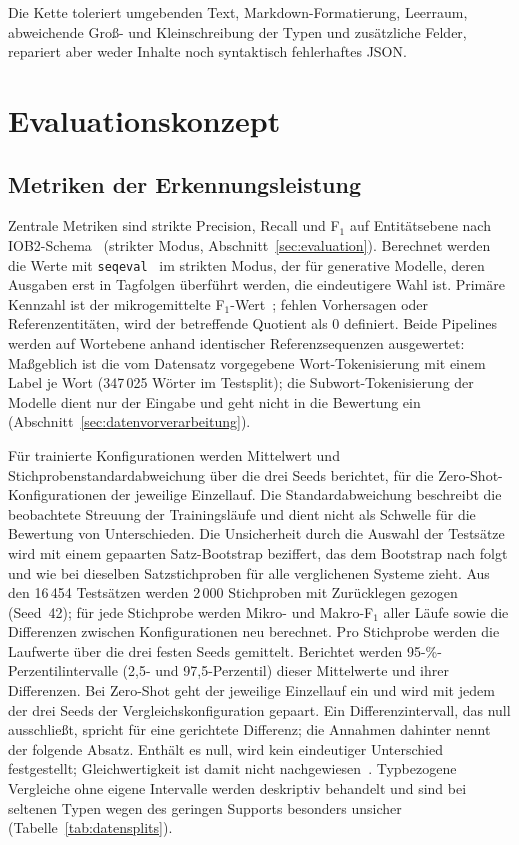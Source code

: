 Die Kette toleriert umgebenden Text, Markdown-Formatierung, Leerraum,
abweichende Groß- und Kleinschreibung der Typen und zusätzliche Felder, repariert aber weder Inhalte
noch syntaktisch fehlerhaftes JSON.

\section{Evaluationskonzept}
\label{sec:evaluationskonzept}

\subsection{Metriken der Erkennungsleistung}
\label{sec:performanzmetriken}

Zentrale Metriken sind strikte Precision, Recall und F$_1$ auf
Entitätsebene nach IOB2-Schema~\cite{manning2008introduction,sang2003conll,tjong1999representing}
(strikter Modus, Abschnitt~\ref{sec:evaluation}).
Berechnet werden die Werte mit
\texttt{seqeval}~\cite{nakayama2018seqeval} im strikten Modus, der für
generative Modelle, deren Ausgaben erst in Tagfolgen überführt werden,
die eindeutigere Wahl ist.
Primäre Kennzahl ist der mikrogemittelte
F$_1$-Wert~\cite{manning2008introduction}; fehlen Vorhersagen
oder Referenzentitäten, wird der betreffende Quotient als 0 definiert.
Beide Pipelines werden auf Wortebene anhand identischer Referenzsequenzen
ausgewertet: Maßgeblich ist die vom Datensatz vorgegebene
Wort-Tokenisierung mit einem Label je Wort (347\,025 Wörter im
Testsplit); die Subwort-Tokenisierung der Modelle dient nur der Eingabe
und geht nicht in die Bewertung ein
(Abschnitt~\ref{sec:datenvorverarbeitung}).

Für trainierte Konfigurationen werden Mittelwert und
Stichprobenstandardabweichung über die drei Seeds berichtet, für die
Zero-Shot-Konfigurationen der jeweilige Einzellauf. Die
Standardabweichung beschreibt die beobachtete Streuung der Trainingsläufe
und dient nicht als Schwelle für die Bewertung von Unterschieden.
Die Unsicherheit durch die Auswahl der Testsätze wird mit einem
gepaarten Satz-Bootstrap beziffert, das dem Bootstrap nach
\textcite{efron1993bootstrap} folgt und wie bei
\textcite{koehn2004bootstrap} dieselben Satzstichproben für alle
verglichenen Systeme zieht.
Aus den 16\,454 Testsätzen werden 2\,000 Stichproben mit Zurücklegen
gezogen (Seed~42); für jede Stichprobe werden Mikro- und Makro-F$_1$ aller Läufe
sowie die Differenzen zwischen Konfigurationen neu berechnet.
Pro Stichprobe werden die Laufwerte über die drei festen Seeds
gemittelt. Berichtet werden 95-\%-Perzentilintervalle (2,5- und
97,5-Perzentil) dieser Mittelwerte und ihrer Differenzen.
Bei Zero-Shot geht der jeweilige Einzellauf ein und wird mit jedem der
drei Seeds der Vergleichskonfiguration gepaart.
Ein Differenzintervall, das null ausschließt, spricht für eine
gerichtete Differenz; die Annahmen dahinter nennt der folgende Absatz.
Enthält es null, wird kein
eindeutiger Unterschied festgestellt; Gleichwertigkeit ist damit nicht
nachgewiesen~\cite{lakens2017equivalence}. Typbezogene Vergleiche ohne eigene Intervalle werden
deskriptiv behandelt und sind bei seltenen Typen wegen des geringen
Supports besonders unsicher (Tabelle~\ref{tab:datensplits}).

